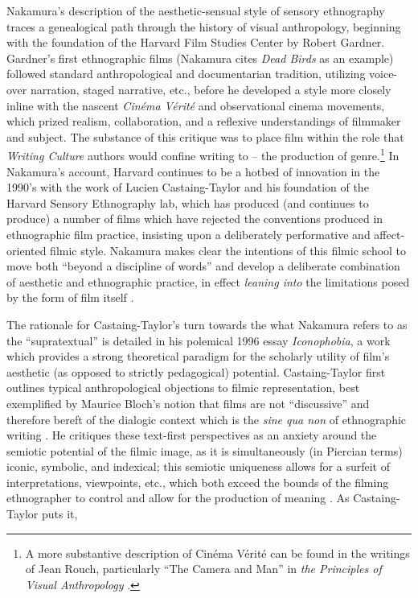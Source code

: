 Nakamura's description of the aesthetic-sensual style of sensory
ethnography traces a genealogical path through the history of visual
anthropology, beginning with the foundation of the Harvard Film Studies
Center by Robert Gardner. Gardner's first ethnographic films (Nakamura
cites \emph{Dead Birds} as an example) followed standard anthropological
and documentarian tradition, utilizing voice-over narration, staged
narrative, etc., before he developed a style more closely inline with
the nascent \emph{Cinéma Vérité} and observational cinema movements,
which prized realism, collaboration, and a reflexive understandings of
filmmaker and subject. The substance of this critique was to place film
within the role that \emph{Writing Culture} authors would confine
writing to -- the production of genre.\footnote{A more substantive
  description of Cinéma Vérité can be found in the writings of Jean
  Rouch, particularly ``The Camera and Man'' in \emph{the Principles of
  Visual Anthropology} \autocite{rouch_camera_2009}.} In Nakamura's
account, Harvard continues to be a hotbed of innovation in the 1990's
with the work of Lucien Castaing-Taylor and his foundation of the
Harvard Sensory Ethnography lab, which has produced (and continues to
produce) a number of films which have rejected the conventions produced
in ethnographic film practice, insisting upon a deliberately
performative and affect-oriented filmic style. Nakamura makes clear the
intentions of this filmic school to move both ``beyond a discipline of
words'' and develop a deliberate combination of aesthetic and
ethnographic practice, in effect \emph{leaning into} the limitations
posed by the form of film itself
\autocite*[133-134]{nakamura_making_2013}.

The rationale for Castaing-Taylor's turn towards the what Nakamura
refers to as the ``supratextual'' \autocite*[ 133]{nakamura_making_2013}
is detailed in his polemical 1996 essay \emph{Iconophobia}, a work which
provides a strong theoretical paradigm for the scholarly utility of
film's aesthetic (as opposed to strictly pedagogical) potential.
Castaing-Taylor first outlines typical anthropological objections to
filmic representation, best exemplified by Maurice Bloch's notion that
films are not ``discussive'' and therefore bereft of the dialogic
context which is the \emph{sine qua non} of ethnographic writing
\autocite[66]{taylor_iconophobia:_1996}. He critiques these text-first
perspectives as an anxiety around the semiotic potential of the filmic
image, as it is simultaneously (in Piercian terms) iconic, symbolic, and
indexical; this semiotic uniqueness allows for a surfeit of
interpretations, viewpoints, etc., which both exceed the bounds of the
filming ethnographer to control and allow for the production of meaning
\autocite[75]{taylor_iconophobia:_1996}. As Castaing-Taylor puts it,

